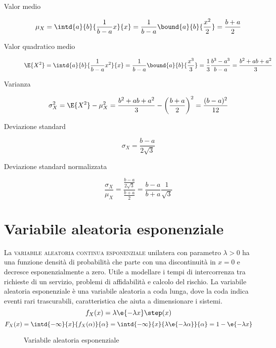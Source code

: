 \begin{description}
\item[Valor medio]
\[\mu_X=\intd{a}{b}{\frac{1}{b-a}x}{x}=\frac{1}{b-a}\bound{a}{b}{\frac{x^2}{2}}=\frac{b+a}{2}
\]
\item[Valor quadratico medio] 
\[\E{X^2}=\intd{a}{b}{\frac{1}{b-a}x^2}{x}=\frac{1}{b-a}\bound{a}{b}{\frac{x^3}{3}}=\frac{1}{3}\frac{b^3-a^3}{b-a}=\frac{b^2+a b+a^2}{3}
\]
\item[Varianza]
\[\sigma^2_X=\E{X^2}-\mu^2_X=\frac{b^2+a b+a^2}{3}-\left(\frac{b+a}{2}\right)^2=\frac{(b-a)^2}{12}
\]
\item[Deviazione standard]
\[\sigma_X=\frac{b-a}{2\sqrt{3}}
\]
\item[Deviazione standard normalizzata]
\[\frac{\sigma_X}{\mu_X}=\frac{\frac{b-a}{2\sqrt{3}}}{\frac{b+a}{2}}=\frac{b-a}{b+a}\frac{1}{\sqrt{3}}
\]
\end{description}

\section{Variabile aleatoria esponenziale}
La \textsc{variabile aleatoria continua esponenziale} unilatera con parametro $\lambda>0$ ha una funzione densità di probabilità che parte con una discontinuità in $x=0$ e decresce esponenzialmente a zero. Utile a modellare i tempi di intercorrenza tra richieste di un servizio, problemi di affidabilità e calcolo del rischio. La variabile aleatoria esponenziale è una variabile aleatoria a coda lunga, dove la coda indica eventi rari trascurabili, caratteristica che aiuta a dimensionare i sistemi.
\begin{equation}
	f_X(x)=\lambda\e{-\lambda x}\step(x)
\end{equation}
\begin{equation}
	F_X(x)=\intd{-\infty}{x}{f_X(\alpha)}{\alpha}=\intd{-\infty}{x}{\lambda\e{-\lambda \alpha}}{\alpha}=1-\e{-\lambda x}
\end{equation}
\begin{figure}[!ht]
	\centering
	\qquad
	\caption{Variabile aleatoria esponenziale}
\end{figure}

